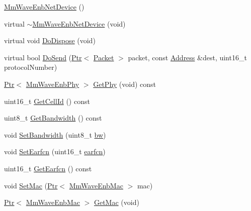 \begin{DoxyCompactItemize}
\item 
\hyperlink{classns3_1_1MmWaveEnbNetDevice_a6dfcf1bd7fd9be987a1cbbed36a31189}{Mm\+Wave\+Enb\+Net\+Device} ()
\item 
virtual \hyperlink{classns3_1_1MmWaveEnbNetDevice_a167236b5d3800d064ae4001e23daefe5}{$\sim$\+Mm\+Wave\+Enb\+Net\+Device} (void)
\item 
virtual void \hyperlink{classns3_1_1MmWaveEnbNetDevice_aa7f6986a49304b84efa50a92cd392cf4}{Do\+Dispose} (void)
\item 
virtual bool \hyperlink{classns3_1_1MmWaveEnbNetDevice_aae63465935afa5d213b3bbd712ea6d98}{Do\+Send} (\hyperlink{classns3_1_1Ptr}{Ptr}$<$ \hyperlink{classns3_1_1Packet}{Packet} $>$ packet, const \hyperlink{classns3_1_1Address}{Address} \&dest, uint16\+\_\+t protocol\+Number)
\item 
\hyperlink{classns3_1_1Ptr}{Ptr}$<$ \hyperlink{classns3_1_1MmWaveEnbPhy}{Mm\+Wave\+Enb\+Phy} $>$ \hyperlink{classns3_1_1MmWaveEnbNetDevice_a66bf394e8d7f7c853f4fc6b671f188ca}{Get\+Phy} (void) const 
\item 
uint16\+\_\+t \hyperlink{classns3_1_1MmWaveEnbNetDevice_a596bca93afc4c5dbe2c1f626517ec728}{Get\+Cell\+Id} () const 
\item 
uint8\+\_\+t \hyperlink{classns3_1_1MmWaveEnbNetDevice_ab869a702431dd80516725ac88f43c00d}{Get\+Bandwidth} () const 
\item 
void \hyperlink{classns3_1_1MmWaveEnbNetDevice_a9820fa05028848cb0f460f0cfc37b659}{Set\+Bandwidth} (uint8\+\_\+t \hyperlink{lte__ue__measurements_8m_a3f7228a3941f19f282647a09dd494528}{bw})
\item 
void \hyperlink{classns3_1_1MmWaveEnbNetDevice_a7b18a7465ec2a0ab52a7034a37a49fe6}{Set\+Earfcn} (uint16\+\_\+t \hyperlink{generate__test__data__lte__spectrum__value__txpsd_8m_a584be7562abb392609629331f8c6c42c}{earfcn})
\item 
uint16\+\_\+t \hyperlink{classns3_1_1MmWaveEnbNetDevice_a15f8942dfbada2c8a042d164a5d111d4}{Get\+Earfcn} () const 
\item 
void \hyperlink{classns3_1_1MmWaveEnbNetDevice_a5dd63ab89dce5ce468ecce80165a8380}{Set\+Mac} (\hyperlink{classns3_1_1Ptr}{Ptr}$<$ \hyperlink{classns3_1_1MmWaveEnbMac}{Mm\+Wave\+Enb\+Mac} $>$ mac)
\item 
\hyperlink{classns3_1_1Ptr}{Ptr}$<$ \hyperlink{classns3_1_1MmWaveEnbMac}{Mm\+Wave\+Enb\+Mac} $>$ \hyperlink{classns3_1_1MmWaveEnbNetDevice_aa32992373e5de4c6228a793b345b3479}{Get\+Mac} (void)
\item 

\end{DoxyCompactItemize}
